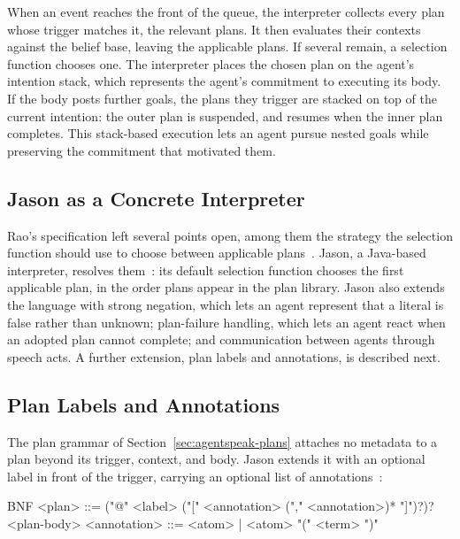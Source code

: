 When an event reaches the front of the queue, the interpreter collects every plan whose trigger matches it, the relevant plans. It then evaluates their contexts against the belief base, leaving the applicable plans. If several remain, a selection function chooses one. The interpreter places the chosen plan on the agent's intention stack, which represents the agent's commitment to executing its body. If the body posts further goals, the plans they trigger are stacked on top of the current intention: the outer plan is suspended, and resumes when the inner plan completes. This stack-based execution lets an agent pursue nested goals while preserving the commitment that motivated them.
 
\subsection{Jason as a Concrete Interpreter}
\label{sec:jason-overview}
 
Rao's specification left several points open, among them the strategy the selection function should use to choose between applicable plans~\cite{Rao1996}. Jason, a Java-based interpreter, resolves them~\cite{Bordini2007}: its default selection function chooses the first applicable plan, in the order plans appear in the plan library. Jason also extends the language with strong negation, which lets an agent represent that a literal is false rather than unknown; plan-failure handling, which lets an agent react when an adopted plan cannot complete; and communication between agents through speech acts. A further extension, plan labels and annotations, is described next.
 
\subsection{Plan Labels and Annotations}
\label{sec:jason-annotations}
 
The plan grammar of Section~\ref{sec:agentspeak-plans} attaches no metadata to a plan beyond its trigger, context, and body. Jason extends it with an optional label in front of the trigger, carrying an optional list of annotations~\cite{Bordini2007}:
 
\begin{codeblock}[]{BNF}
    <plan> ::= ("@" <label> ("[" <annotation> ("," <annotation>)* "]")?)? <plan-body>
    <annotation> ::= <atom> | <atom> "(" <term> ")"
\end{codeblock}
 

